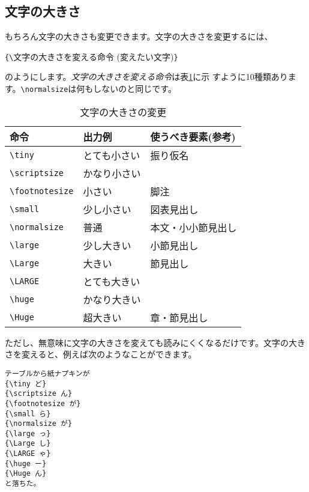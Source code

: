 \subsection{文字の大きさ}
もちろん文字の大きさも変更できます。文字の大きさを変更するには、
\begin{screen}
\verb+{\+文字の大きさを変える命令 (変えたい文字)\verb+}+
\end{screen}
のようにします。\emph{文字の大きさを変える命令}は表\ref{tab:size}に示
すように10種類あります。\verb+\normalsize+は何もしないのと同じです。\\
\begin{table}[htbp]
\begin{center}
\caption{文字の大きさの変更}
\label{tab:size}
\begin{tabular}{lll}
\hline
 命令 & 出力例 & 使うべき要素(参考) \\
\hline
 \verb+\tiny+         & {\tiny とても小さい}       & 振り仮名           \\
 \verb+\scriptsize+   & {\scriptsize かなり小さい} &                    \\
 \verb+\footnotesize+ & {\footnotesize 小さい}     & 脚注               \\
 \verb+\small+        & {\small 少し小さい}        & 図表見出し         \\
 \verb+\normalsize+   & {\normalsize 普通}         & 本文・小小節見出し \\
 \verb+\large+        & {\large 少し大きい}        & 小節見出し         \\
 \verb+\Large+        & {\Large 大きい}            & 節見出し           \\
 \verb+\LARGE+        & {\LARGE とても大きい}      &                    \\
 \verb+\huge+         & {\huge かなり大きい}       &                    \\
 \verb+\Huge+         & {\Huge 超大きい}           & 章・節見出し       \\
\hline
\end{tabular}
\end{center}
\end{table}
ただし、無意味に文字の大きさを変えても読みにくくなるだけです。文字の大き
さを変えると、例えば次のようなことができます。\\
\begin{minipage}[c]{.50\textwidth}
\begin{screen}
\small
\begin{verbatim}
テーブルから紙ナプキンが
{\tiny ど}
{\scriptsize ん}
{\footnotesize が}
{\small ら}
{\normalsize が}
{\large っ}
{\Large し}
{\LARGE ゃ}
{\huge ー}
{\Huge ん}
と落ちた。
\end{verbatim}
\end{screen}
\end{minipage}%
